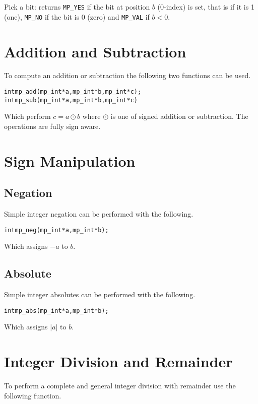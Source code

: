 \documentclass[synpaper]{book}
\begin{document}
Pick a bit: returns \texttt{MP\_YES} if the bit at position $b$ (0-index) is set, that is if it is 1 (one), \texttt{MP\_NO}
if the bit is 0 (zero) and \texttt{MP\_VAL} if $b < 0$.

\section{Addition and Subtraction}

To compute an addition or subtraction the following two functions can be used.

 
\begin{alltt}
int mp_add (mp_int * a, mp_int * b, mp_int * c);
int mp_sub (mp_int * a, mp_int * b, mp_int * c)
\end{alltt}

Which perform $c = a \odot b$ where $\odot$ is one of signed addition or subtraction.  The operations are fully sign
aware.

\section{Sign Manipulation}
\subsection{Negation}
\label{sec:NEG}
Simple integer negation can be performed with the following.

\begin{alltt}
int mp_neg (mp_int * a, mp_int * b);
\end{alltt}

Which assigns $-a$ to $b$.

\subsection{Absolute}
Simple integer absolutes can be performed with the following.

\begin{alltt}
int mp_abs (mp_int * a, mp_int * b);
\end{alltt}

Which assigns $\vert a \vert$ to $b$.

\section{Integer Division and Remainder}
To perform a complete and general integer division with remainder use the following function.
\end{document}

